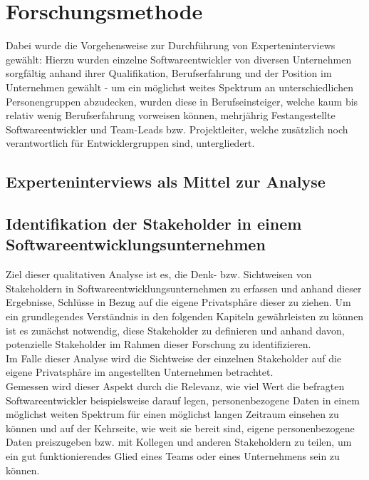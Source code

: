 \chapter{Forschungsmethode} %
\label{Research} %

Dabei wurde die Vorgehensweise zur Durchführung von Experteninterviews gewählt: Hierzu wurden einzelne Softwareentwickler von diversen Unternehmen sorgfältig
anhand ihrer Qualifikation, Berufserfahrung und der Position im Unternehmen gewählt - um ein möglichst weites Spektrum an unterschiedlichen Personengruppen abzudecken, wurden diese in Berufseinsteiger,
welche kaum bis relativ wenig Berufserfahrung vorweisen können, mehrjährig Festangestellte Softwareentwickler und Team-Leads bzw. Projektleiter, welche zusätzlich noch verantwortlich für Entwicklergruppen sind,
untergliedert.

\section{Experteninterviews als Mittel zur Analyse}

\section{Identifikation der Stakeholder in einem Softwareentwicklungsunternehmen}
Ziel dieser qualitativen Analyse ist es, die Denk- bzw. Sichtweisen von Stakeholdern in Softwareentwicklungsunternehmen zu erfassen und anhand dieser Ergebnisse, Schlüsse in Bezug auf die
eigene Privatsphäre dieser zu ziehen. Um ein grundlegendes Verständnis in den folgenden Kapiteln gewährleisten zu können ist es zunächst notwendig, diese Stakeholder zu definieren und anhand davon, 
potenzielle Stakeholder im Rahmen dieser Forschung zu identifizieren. \\ 
Im Falle dieser Analyse wird die Sichtweise der einzelnen Stakeholder auf die eigene Privatsphäre im angestellten Unternehmen betrachtet. \\ Gemessen wird dieser Aspekt durch die Relevanz, wie viel Wert die befragten
Softwareentwickler beispielsweise darauf legen, personenbezogene Daten in einem möglichst weiten Spektrum für einen möglichst langen Zeitraum einsehen zu können und auf der Kehrseite, wie weit sie bereit sind, eigene
personenbezogene Daten preiszugeben bzw. mit Kollegen und anderen Stakeholdern zu teilen, um ein gut funktionierendes Glied eines Teams oder eines Unternehmens sein zu können.

